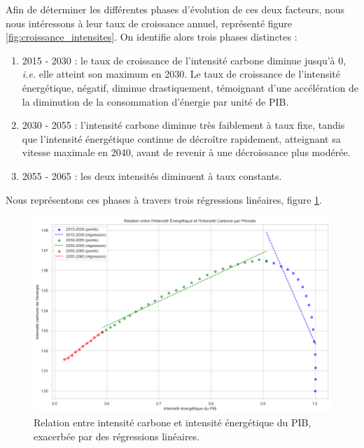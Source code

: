 \documentclass[a4,11pt]{aleph-notas}
\begin{document}
Afin de déterminer les différentes phases d'évolution de ces deux facteurs, nous nous intéressons à leur taux de croissance annuel, représenté figure \ref{fig:croissance_intensites}. On identifie alors trois phases distinctes :
\begin{enumerate}
    \item 2015 - 2030 : le taux de croissance de l'intensité carbone diminue jusqu'à 0, \textit{i.e.} elle atteint son maximum en 2030. Le taux de croissance de l'intensité énergétique, négatif, diminue drastiquement, témoignant d'une accélération de la diminution de la consommation d'énergie par unité de PIB. 
    \item 2030 - 2055 : l'intensité carbone diminue très faiblement à taux fixe, tandis que l'intensité énergétique continue de décroître rapidement, atteignant sa vitesse maximale en 2040, avant de revenir à une décroissance plus modérée.
    \item 2055 - 2065 : les deux intensités diminuent à taux constants.
\end{enumerate}

Nous représentons ces phases à travers trois régressions linéaires, figure \ref{fig:regression_intensite}.

\begin{figure}[H]
    \centering
    \includegraphics[width=\textwidth]{images_IMACLIM/regression_intensite.png}
    \caption{Relation entre intensité carbone et intensité énergétique du PIB, exacerbée par des régressions linéaires.}
    \label{fig:regression_intensite}
\end{figure}
\end{document}

